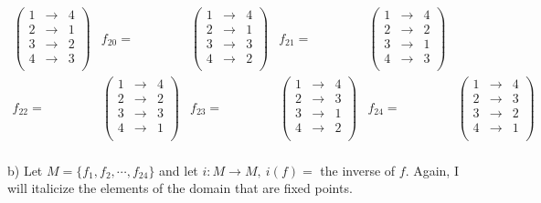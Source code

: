 \documentclass[11pt]{article}
\begin{document}
\begin{flushleft}
\begin{align*}
\begin{pmatrix}
1 & \rightarrow & 4\\
2 & \rightarrow & 1\\
3 & \rightarrow & 2\\
4 & \rightarrow & 3\\
\end{pmatrix} &
f_{20} = & 
\begin{pmatrix}
1 & \rightarrow & 4\\
2 & \rightarrow & 1\\
\mathit{3} & \rightarrow & 3\\
4 & \rightarrow & 2\\
\end{pmatrix} &
f_{21} = & 
\begin{pmatrix}
1 & \rightarrow & 4\\
\mathit{2} & \rightarrow & 2\\
3 & \rightarrow & 1\\
4 & \rightarrow & 3\\
\end{pmatrix} \\
f_{22} = &
\begin{pmatrix}
1 & \rightarrow & 4\\
\mathit{2} & \rightarrow & 2\\
\mathit{3} & \rightarrow & 3\\
4 & \rightarrow & 1\\
\end{pmatrix} &
f_{23} = & 
\begin{pmatrix}
1 & \rightarrow & 4\\
2 & \rightarrow & 3\\
3 & \rightarrow & 1\\
4 & \rightarrow & 2\\
\end{pmatrix} &
f_{24} = & 
\begin{pmatrix}
1 & \rightarrow & 4\\
2 & \rightarrow & 3\\
3 & \rightarrow & 2\\
4 & \rightarrow & 1\\
\end{pmatrix} \\
\end{align*}

\newpage

b) Let $M = \{ f_1, f_2, \cdots, f_{24} \}$ and let $i: M \rightarrow M, \ i(f) = $ the inverse of $f$. Again, I will italicize the elements of the domain that are fixed points.


\end{flushleft}
\end{document}
